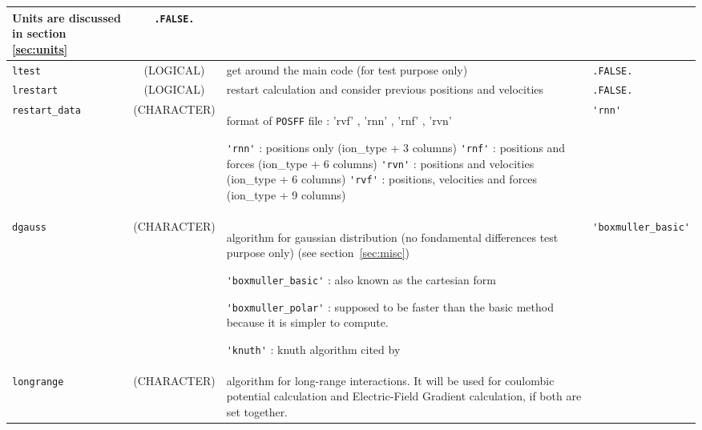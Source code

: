 \documentclass[a4paper,8pt]{article}
\begin{document}
\begin{longtable}{l|c|m{8cm}|m{2cm}}
					 Units are discussed in section \ref{sec:units} \newline                            & \verb?.FALSE.? \\ 
\hline
\rule[-0.75cm]{0cm}{1.5cm}
\verb?ltest?     & (LOGICAL)          &  get around the main code (for test purpose only)                                   & \verb?.FALSE.? \\
\hline
\rule[-0.75cm]{0cm}{1.5cm}
\verb?lrestart?   & (LOGICAL)         &  restart calculation and consider previous positions and velocities                 & \verb?.FALSE.? \\
\hline
\rule[-0.75cm]{0cm}{1.5cm}
\verb?restart_data?  
                 & (CHARACTER)        &  format of  \verb?POSFF? file : 'rvf' , 'rnn' , 'rnf' , 'rvn' \newline

                                         \verb?'rnn'? : positions only                   (ion\_type + 3 columns) \newline 
                                         \verb?'rnf'? : positions and forces             (ion\_type + 6 columns) \newline 
                                         \verb?'rvn'? : positions and velocities         (ion\_type + 6 columns) \newline 
                                         \verb?'rvf'? : positions, velocities and forces (ion\_type + 9 columns) 

                                                                                                                            & \verb?'rnn'? \tabularnewline
\hline
\rule[-0.75cm]{0cm}{1.5cm}
\verb?dgauss?    & (CHARACTER)        & \newline algorithm for gaussian distribution (no fondamental differences test purpose only) 
                                        (see section~\ref{sec:misc}) \newline  

                                        \verb?'boxmuller_basic'? : also known as the cartesian form  \newline

					\verb?'boxmuller_polar'? : supposed to be faster than the basic method because it is 
					simpler to compute.     \newline

					\verb?'knuth'? : knuth algorithm cited by~\cite{B-ALLEN_TILDESLEY} \newline         & \verb?'boxmuller_basic'? \tabularnewline
\hline
\rule[-0.75cm]{0cm}{1.5cm}
\verb?longrange? & (CHARACTER)        & \newline algorithm for long-range interactions. It will be used for coulombic potential 
                                        calculation and Electric-Field Gradient calculation, if both are set together. \newline


\end{longtable}
\end{document}
